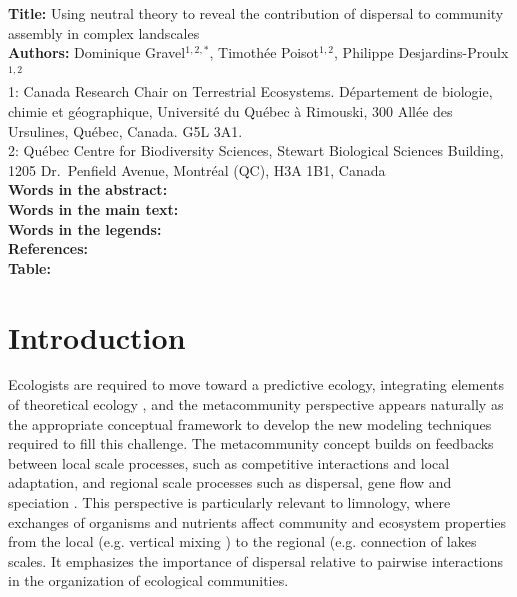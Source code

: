 \documentclass[12pt]{article}
\begin{document}
\linenumbers 
\modulolinenumbers[1]

\textbf{Title:}   Using neutral theory to reveal the contribution of dispersal to community assembly in complex landscales\\

\textbf{Authors:}  Dominique Gravel$^{1,2,*}$, Timoth\'ee Poisot$^{1,2}$, Philippe Desjardins-Proulx$^{1,2}$\\

1: Canada Research Chair on Terrestrial Ecosystems. D\'epartement de biologie, chimie et g\'eographique, Universit\'e du Qu\'ebec \`a Rimouski, 300 All\'ee des Ursulines, Qu\'ebec, Canada. G5L 3A1.\\

2: Qu\'ebec Centre for Biodiversity Sciences, Stewart Biological Sciences Building, 1205 Dr.~Penfield Avenue, Montr\'eal (QC), H3A 1B1, Canada\\

\textbf{Words in the abstract:}      \\
\textbf{Words in the main text:}    \\
\textbf{Words in the legends:}    \\
\textbf{References:}             \\
\textbf{Table:}                    \\

\newpage
\doublespacing

\section{Introduction}

Ecologists are required to move toward a predictive ecology, integrating
elements of theoretical ecology \parencite{Thuiller2013}, and the metacommunity
perspective appears naturally as the appropriate conceptual framework to develop
the new modeling techniques required to fill this challenge. The metacommunity
concept builds on feedbacks between local scale processes, such as competitive
interactions and local adaptation, and regional scale processes such as
dispersal, gene flow and speciation \textcite{Leibold2004a}. This perspective is
particularly relevant to limnology, where exchanges of organisms and nutrients
affect community and ecosystem properties from the local (e.g. vertical mixing
\parencite{Ryabov2011}) to the regional (e.g. connection of lakes
\parencite{Leibold2004b} scales. It emphasizes the importance of dispersal
relative to pairwise interactions in the organization of ecological communities.
\end{document}
